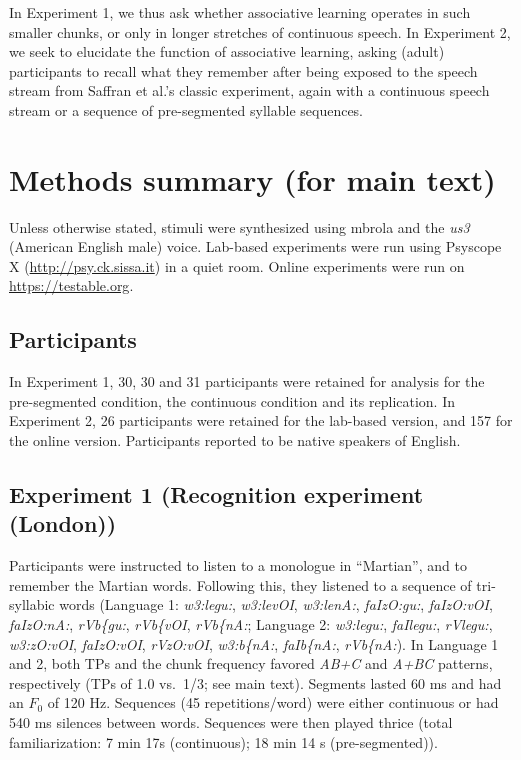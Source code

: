 \documentclass[
]{article}
\begin{document}
In Experiment 1, we thus ask whether associative learning operates in
such smaller chunks, or only in longer stretches of continuous speech.
In Experiment 2, we seek to elucidate the function of associative
learning, asking (adult) participants to recall what they remember after
being exposed to the speech stream from Saffran et al.'s
\citep{Saffran-Science} classic experiment, again with a continuous
speech stream or a sequence of pre-segmented syllable sequences.

\clearpage

\hypertarget{methods-summary-for-main-text}{%
\section{Methods summary (for main
text)}\label{methods-summary-for-main-text}}

Unless otherwise stated, stimuli were synthesized using mbrola
\citep{mbrola} and the \emph{us3} (American English male) voice.
Lab-based experiments were run using Psyscope X
(\url{http://psy.ck.sissa.it}) in a quiet room. Online experiments were
run on \url{https://testable.org}.

\hypertarget{participants}{%
\subsection{Participants}\label{participants}}

In Experiment 1, 30, 30 and 31 participants were retained for analysis
for the pre-segmented condition, the continuous condition and its
replication. In Experiment 2, 26 participants were retained for the
lab-based version, and 157 for the online version. Participants reported
to be native speakers of English.

\hypertarget{experiment-1-recognition-experiment-london}{%
\subsection{Experiment 1 (Recognition experiment
(London))}\label{experiment-1-recognition-experiment-london}}

Participants were instructed to listen to a monologue in ``Martian'',
and to remember the Martian words. Following this, they listened to a
sequence of tri-syllabic words (Language 1: \emph{w3:legu:},
\emph{w3:levOI}, \emph{w3:lenA:}, \emph{faIzO:gu:}, \emph{faIzO:vOI},
\emph{faIzO:nA:}, \emph{rVb\{gu:}, \emph{rVb\{vOI}, \emph{rVb\{nA:};
Language 2: \emph{w3:legu:}, \emph{faIlegu:}, \emph{rVlegu:},
\emph{w3:zO:vOI}, \emph{faIzO:vOI}, \emph{rVzO:vOI}, \emph{w3:b\{nA:},
\emph{faIb\{nA:}, \emph{rVb\{nA:}). In Language 1 and 2, both TPs and
the chunk frequency favored \emph{AB+C} and \emph{A+BC} patterns,
respectively (TPs of 1.0 vs.~1/3; see main text). Segments lasted 60 ms
and had an \(F_0\) of 120 Hz. Sequences (45 repetitions/word) were
either continuous or had 540 ms silences between words. Sequences were
then played thrice (total familiarization: 7 min 17s (continuous); 18
min 14 s (pre-segmented)).
\end{document}
